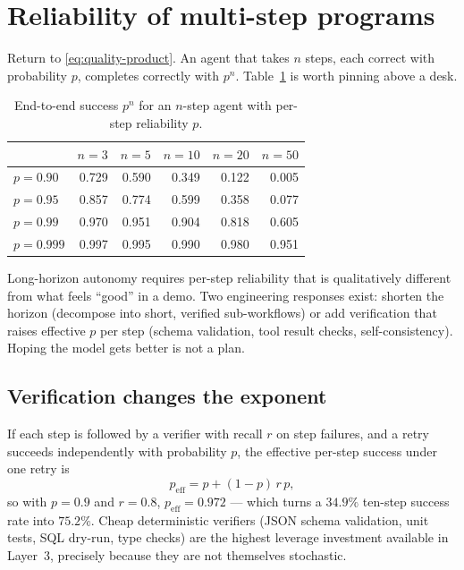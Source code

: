 \documentclass[11pt,twoside,openright]{book}
\theoremstyle{definition}
\theoremstyle{plain}
\theoremstyle{remark}
\begin{document}
\section{Reliability of multi-step programs}

Return to \eqref{eq:quality-product}. An agent that takes $n$ steps, each
correct with probability $p$, completes correctly with $p^n$. Table~\ref{tab:pn}
is worth pinning above a desk.

\begin{table}[H]
\centering\small
\renewcommand{\arraystretch}{1.25}
\begin{tabular}{@{}l rrrrr@{}}
\toprule
& $n=3$ & $n=5$ & $n=10$ & $n=20$ & $n=50$ \\
\midrule
$p=0.90$ & 0.729 & 0.590 & 0.349 & 0.122 & 0.005 \\
$p=0.95$ & 0.857 & 0.774 & 0.599 & 0.358 & 0.077 \\
$p=0.99$ & 0.970 & 0.951 & 0.904 & 0.818 & 0.605 \\
$p=0.999$ & 0.997 & 0.995 & 0.990 & 0.980 & 0.951 \\
\bottomrule
\end{tabular}
\caption{End-to-end success $p^n$ for an $n$-step agent with per-step
reliability $p$.}
\label{tab:pn}
\end{table}

\begin{keyidea}
Long-horizon autonomy requires per-step reliability that is qualitatively
different from what feels ``good'' in a demo. Two engineering responses exist:
shorten the horizon (decompose into short, verified sub-workflows) or add
verification that raises effective $p$ per step (schema validation, tool result
checks, self-consistency). Hoping the model gets better is not a plan.
\end{keyidea}

\subsection{Verification changes the exponent}

If each step is followed by a verifier with recall $r$ on step failures, and a
retry succeeds independently with probability $p$, the effective per-step
success under one retry is
\begin{equation}
  p_{\text{eff}} = p + (1-p)\,r\,p ,
\end{equation}
so with $p=0.9$ and $r=0.8$, $p_{\text{eff}} = 0.972$ --- which turns a
$34.9\%$ ten-step success rate into $75.2\%$. Cheap deterministic verifiers
(JSON schema validation, unit tests, SQL dry-run, type checks) are the highest
leverage investment available in Layer~3, precisely because they are not
themselves stochastic.
\end{document}
